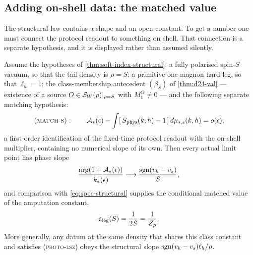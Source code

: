 
\subsection{Adding on-shell data: the matched value}

The structural law contains a shape and an open constant. To get a number one
must connect the protocol readout to something on shell. That connection is a
separate hypothesis, and it is displayed rather than assumed silently.

\begin{theorem}
\label{thm:soft-index-matched}
\statusSketch

Assume the hypotheses of \cref{thm:soft-index-structural}; a fully polarised
spin-$S$ vacuum, so that the tail density is $\rho=S$; a primitive one-magnon
hard leg, so that $\ell_h=1$; the class-membership antecedent
$(\beta_S)$ of \cref{thm:d24-val} --- existence of a source
$O\in\mathcal{S}_W(\rho)|_{\rho=S}$ with $M_1^O\neq0$ --- and the following separate
matching hypothesis:
\begin{equation}
  \textsc{(match-s)}:\qquad
  \mathcal{A}_*(\epsilon)-\int[\,S_{\rm phys}(k,h)-1\,]\,d\mu_{*,\epsilon}(k,h)
  =o(\epsilon),
  \label{eq:match-s}
\end{equation}
a first-order identification of the fixed-time protocol readout with the
on-shell multiplier, containing no numerical slope of its own. Then every
actual limit point has phase slope
\begin{equation}
  \frac{\arg(1+\mathcal{A}_*(\epsilon))}{\bar k_*(\epsilon)}
  \longrightarrow \frac{\operatorname{sgn}(v_h-v_s)}{S},
  \label{eq:matched-slope}
\end{equation}
and comparison with \cref{eq:spec-structural} supplies the conditional matched
value of the amputation constant,
\begin{equation}
  \mathfrak{a}_{\mathrm{leg}}(S)=\frac{1}{2S}=\frac{1}{Z_\rho}.
  \label{eq:matched-value}
\end{equation}
More generally, any datum at the same density that shares this class constant
and satisfies \textsc{(proto-lsz)} obeys the structural slope
$\operatorname{sgn}(v_h-v_s)\ell_h/\rho$.
\end{theorem}

